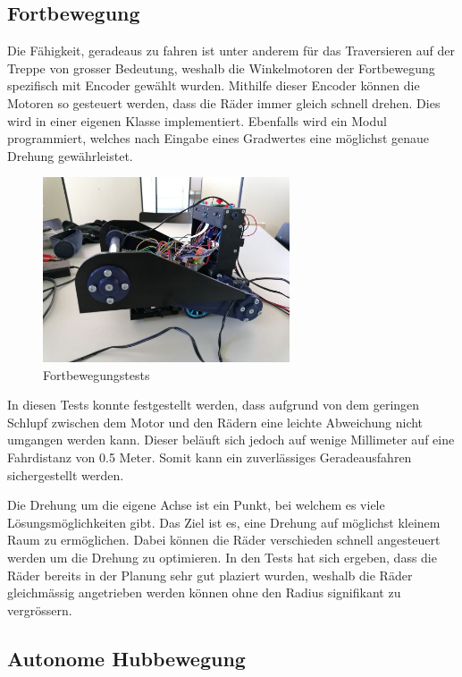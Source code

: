 \subsection{Fortbewegung}

Die Fähigkeit, geradeaus zu fahren ist unter anderem für das Traversieren auf der Treppe von grosser Bedeutung, weshalb die Winkelmotoren der Fortbewegung spezifisch mit Encoder gewählt wurden. Mithilfe dieser Encoder können die Motoren so gesteuert werden, dass die Räder immer gleich schnell drehen. Dies wird in einer eigenen Klasse implementiert. Ebenfalls wird ein Modul programmiert, welches nach Eingabe eines Gradwertes eine möglichst genaue Drehung gewährleistet.

\begin{figure}[H]
  \includegraphics[width=0.65\textwidth]{img/Sprint3/fortbewegung.jpg}
  \centering
  \caption{Fortbewegungstests}
  \label{fig:Fortbewegungstests}
\end{figure}
In diesen Tests konnte festgestellt werden, dass aufgrund von dem geringen Schlupf zwischen dem Motor und den Rädern eine leichte Abweichung nicht umgangen werden kann. Dieser beläuft sich jedoch auf wenige Millimeter auf eine Fahrdistanz von 0.5 Meter. Somit kann ein zuverlässiges Geradeausfahren sichergestellt werden.

Die Drehung um die eigene Achse ist ein Punkt, bei welchem es viele Lösungsmöglichkeiten gibt. Das Ziel ist es, eine Drehung auf möglichst kleinem Raum zu ermöglichen. Dabei können die Räder verschieden schnell angesteuert werden um die Drehung zu optimieren. In den Tests hat sich ergeben, dass die Räder bereits in der Planung sehr gut plaziert wurden, weshalb die Räder gleichmässig angetrieben werden können ohne den Radius signifikant zu vergrössern.



\subsection{Autonome Hubbewegung}


